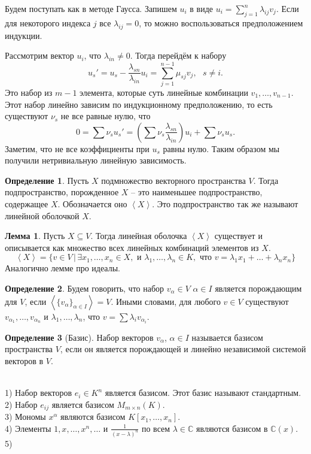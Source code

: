 \documentclass[10pt,a4paper,oneside]{book}
\theoremstyle{definition}
\newtheorem{defn}{Определение}
\newtheorem{lem}{Лемма}
\newcommand{\mb}[1]{\mathbb{#1}}
\def\exm{\noindent {\bf Примеры:}}
\def\lan{\left\langle }
\def\ran{\right\rangle}
\def\dfn{\begin{defn}}
\def\edfn{\end{defn}}
\def\lm{\begin{lem}}
\def\elm{\end{lem}}
\begin{document}
Будем поступать как в методе Гаусса. Запишем $u_i$ в виде 
$u_i=\sum_{j=1}^n \lambda_{ij}v_j$. Если для некоторого индекса $j$ все $\lambda_{ij}=0$, то можно воспользоваться предположением индукции.

Рассмотрим вектор $u_i$, что $\lambda_{in}\neq 0$. Тогда перейдём к набору $$u_s'=u_s - \frac{\lambda_{sn}}{\lambda_{in}}u_i= \sum_{j=1}^{n-1} \mu_{sj} v_j, \,\,\,\, s\neq i.$$
Это набор из $m-1$ элемента, которые суть линейные комбинации $v_1,\dots,v_{n-1}$. Этот набор линейно зависим по индукционному предположению, то есть существуют $\nu_{s}$ не все равные нулю, что
$$0=\sum \nu_s u_{s}'= \left(\sum\nu_s\frac{\lambda_{sn}}{\lambda_{in}}\right)u_i +\sum \nu_s u_s.$$
Заметим, что не все коэффициенты при $u_s$ равны нулю. Таким образом мы получили нетривиальную линейную зависимость.
\endproof




\dfn Пусть $X$ подмножество векторного пространства $V$. Тогда подпространство, порожденное $X$ -- это наименьшее подпространство, содержащее $X$. Обозначается оно $\lan X \ran$. Это подпространство так же называют линейной оболочкой $X$.
\edfn

 
\lm Пусть $X\subseteq V$. Тогда линейная оболочка $\lan X \ran$ существует и описывается как множество всех линейных комбинаций элементов из $X$.
$$\lan X \ran = \{ v\in V\,|\, \exists x_1, \dots,x_n \in X, \text{ и } \lambda_1,\dots,\lambda_n \in K, \text{ что } v=\lambda_1x_1+\dots+\lambda_nx_n\}$$
\proof Аналогично лемме про идеалы.
\endproof
\elm

\dfn Будем говорить, что набор $v_{\alpha} \in V$ $\alpha \in I$ является порождающим для $V$, если $\lan \{v_{\alpha}\}_{\alpha \in I}\ran= V$. Иными словами, для любого $v \in V$ существуют $v_{\alpha_1},\dots,v_{\alpha_n}$  и $\lambda_1,\dots,\lambda_n$, что $v=\sum \lambda_i v_{\alpha_i} $.
\edfn

\dfn[Базис] Набор векторов $v_{\alpha}$, $\alpha \in I$ называется базисом пространства $V$, если он является порождающей и линейно независимой системой векторов в $V$. \edfn

\exm\\
1) Набор векторов $e_i \in K^n$ является базисом. Этот базис называют стандартным.\\
2) Набор $e_{ij}$ является базисом $M_{m\times n}(K)$.\\
3) Мономы $x^{\alpha}$ являются базисом $K[x_1,\dots,x_n]$.\\
4) Элементы $1,x, \dots, x^n, \dots$ и $\frac{1}{(x-\lambda)^n}$ по всем $\lambda \in \mb C$ являются базисом в $\mb C(x)$.\\
5) 
\end{document}
